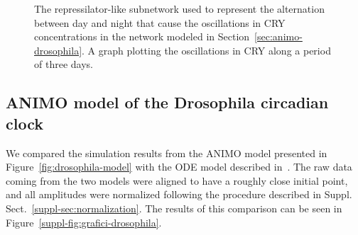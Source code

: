 \documentclass{bmcart}
\begin{document}
\begin{figure}[!htb]
\begin{minipage}{\textwidth}
  \centering
  \qquad
\caption{{\bf \protect{}} The repressilator-like subnetwork used to represent the alternation
between day and night that cause the oscillations in {\sf CRY} concentrations in the
network modeled in Section~\ref{sec:animo-drosophila}.
{\bf \protect{}} A graph plotting the oscillations in {\sf CRY} along
a period of three days.}\label{fig:repressilator}
\end{minipage}
\end{figure}


\subsection{ANIMO model of the Drosophila circadian clock}\label{suppl-sec:animo-drosophila}
We compared the simulation results from the ANIMO model presented in Figure~\ref{fig:drosophila-model}
with the ODE model described in~\cite{drosophila-ode-model}. The raw data coming from the
two models were aligned to have a roughly close initial point, and all amplitudes were normalized
following the procedure described in Suppl. Sect.~\ref{suppl-sec:normalization}. The results
of this comparison can be seen in Figure~\ref{suppl-fig:grafici-drosophila}.
\end{document}
